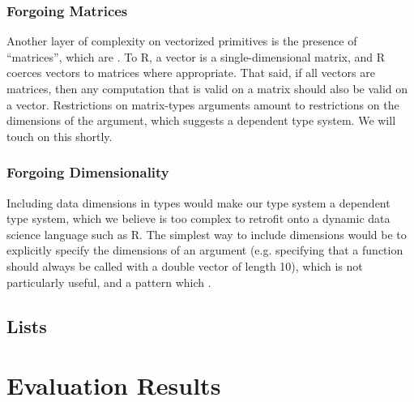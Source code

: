 \documentclass[acmsmall,review,anonymous]{acmart}\settopmatter{printfolios=true,printccs=false,printacmref=false}
\begin{document}
 
%
%
\subsubsection{Forgoing Matrices}

Another layer of complexity on vectorized primitives is the presence of ``matrices'', which are .
To R, a vector is a single-dimensional matrix, and R coerces vectors to matrices where appropriate.
That said, if all vectors are matrices, then any computation that is valid on a matrix should also be valid on a vector.
Restrictions on matrix-types arguments amount to restrictions on the dimensions of the argument, which suggests a dependent type system.
We will touch on this shortly.
 
%
%
\subsubsection{Forgoing Dimensionality} 

Including data dimensions in types would make our type system a dependent type system, which we believe is too complex to retrofit onto a dynamic data science language such as R.
The simplest way to include dimensions would be to explicitly specify the dimensions of an argument (e.g. specifying that a function should always be called with a double vector of length 10), which is not particularly useful, and a pattern which .



%
%
%
%
\subsection{Lists}

%
%
%
%
%
%
\section{Evaluation Results}

\end{document}
